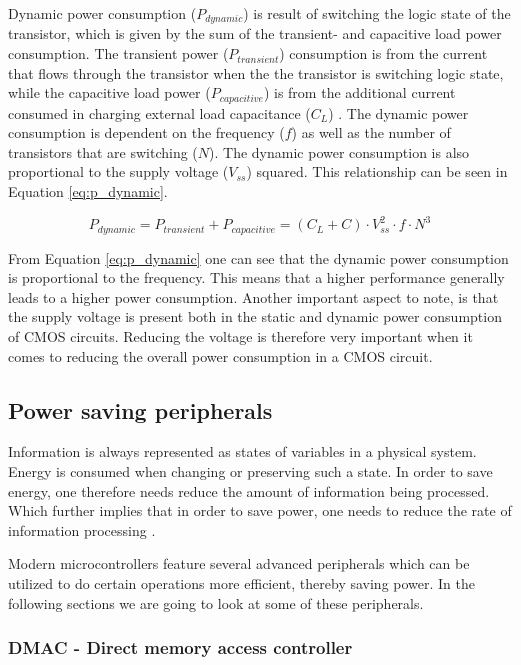 Dynamic power consumption ($P_{dynamic}$) is result of switching the logic state of the transistor, which is given by the sum of the transient- and capacitive load power consumption. The transient power ($P_{transient}$) consumption is from the current that flows through the transistor when the the transistor is switching logic state, while the capacitive load power ($P_{capacitive}$) is from the additional current consumed in charging external load capacitance ($C_{L}$) \cite{cmos_power_consumption}. The dynamic power consumption is dependent on the frequency ($f$) as well as the number of transistors that are switching ($N$). The dynamic power consumption is also proportional to the supply voltage ($V_{ss}$) squared. This relationship can be seen in Equation \ref{eq:p_dynamic}.

\begin{equation}
P_{dynamic} = P_{transient} + P_{capacitive} = (C_L + C) \cdot V_{ss}^{2} \cdot f \cdot N^3
\label{eq:p_dynamic}
\end{equation}

From Equation \ref{eq:p_dynamic} one can see that the dynamic power consumption is proportional to the frequency. This means that a higher performance generally leads to a higher power consumption. Another important aspect to note, is that the supply voltage is present both in the static and dynamic power consumption of CMOS circuits. Reducing the voltage is therefore very important when it comes to reducing the overall power consumption in a CMOS circuit.

\subsection{Power saving peripherals}

Information is always represented as states of variables in a physical system. Energy is consumed when changing or preserving such a state. In order to save energy, one therefore needs reduce the amount of information being processed. Which further implies that in order to save power, one needs to reduce the rate of information processing \cite{sarpeshkar12}.

Modern microcontrollers feature several advanced peripherals which can be utilized to do certain operations more efficient, thereby saving power. In the following sections we are going to look at some of these peripherals.

\subsubsection{DMAC - Direct memory access controller}

